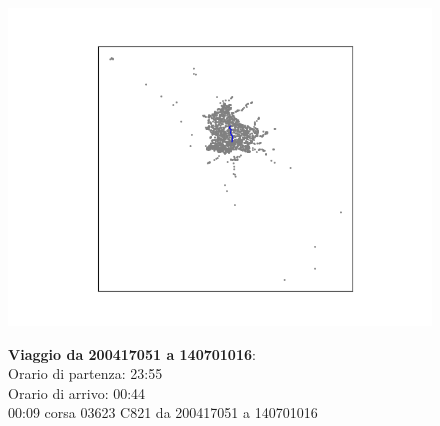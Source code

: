 \documentclass{article}
\begin{document}
\begin{figure}[H]
	\begin{minipage}{0.55\linewidth}
		\centering
		\hspace*{-3cm}\includegraphics[width=1.0\linewidth, valign=t]{figures/200417051_140701016}
	\end{minipage}
	\hspace*{-2cm}\begin{minipage}{0.7\linewidth}
		\textbf{Viaggio da 200417051 a 140701016}:\\
		Orario di partenza: 23:55\\
		Orario di arrivo: 00:44\\
		00:09 corsa 03623 C821 da 200417051 a 140701016
		
	\end{minipage}
\end{figure}
\end{document}
